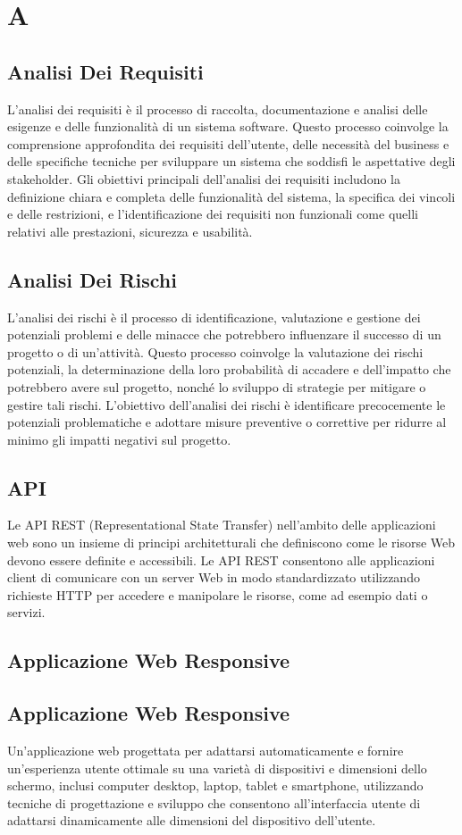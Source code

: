 \section*{A} 
\subsection*{Analisi Dei Requisiti} 
L'analisi dei requisiti è il processo di raccolta, documentazione e analisi delle esigenze e delle funzionalità di un sistema software. Questo processo coinvolge la comprensione approfondita dei requisiti dell'utente, delle necessità del business e delle specifiche tecniche per sviluppare un sistema che soddisfi le aspettative degli stakeholder. Gli obiettivi principali dell'analisi dei requisiti includono la definizione chiara e completa delle funzionalità del sistema, la specifica dei vincoli e delle restrizioni, e l'identificazione dei requisiti non funzionali come quelli relativi alle prestazioni, sicurezza e usabilità.
\subsection*{Analisi Dei Rischi} 
L'analisi dei rischi è il processo di identificazione, valutazione e gestione dei potenziali problemi e delle minacce che potrebbero influenzare il successo di un progetto o di un'attività. Questo processo coinvolge la valutazione dei rischi potenziali, la determinazione della loro probabilità di accadere e dell'impatto che potrebbero avere sul progetto, nonché lo sviluppo di strategie per mitigare o gestire tali rischi. L'obiettivo dell'analisi dei rischi è identificare precocemente le potenziali problematiche e adottare misure preventive o correttive per ridurre al minimo gli impatti negativi sul progetto.
\subsection*{API} 
Le API REST (Representational State Transfer) nell'ambito delle applicazioni web sono un insieme di principi architetturali che definiscono come le risorse Web devono essere definite e accessibili. Le API REST consentono alle applicazioni client di comunicare con un server Web in modo standardizzato utilizzando richieste HTTP per accedere e manipolare le risorse, come ad esempio dati o servizi.
\subsection{Applicazione Web Responsive} 
\subsection*{Applicazione Web Responsive} 
Un'applicazione web progettata per adattarsi automaticamente e fornire un'esperienza utente ottimale su una varietà di dispositivi e dimensioni dello schermo, inclusi computer desktop, laptop, tablet e smartphone, utilizzando tecniche di progettazione e sviluppo che consentono all'interfaccia utente di adattarsi dinamicamente alle dimensioni del dispositivo dell'utente.
